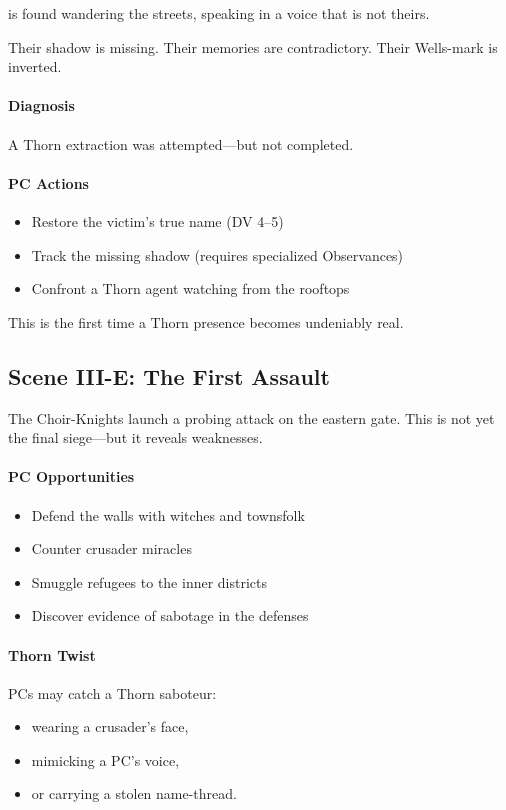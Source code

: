 \documentclass[11pt]{book}
\begin{document}
is found wandering the streets, speaking in a voice that is not theirs.

Their shadow is missing.  
Their memories are contradictory.  
Their Wells-mark is inverted.

\paragraph{Diagnosis}
A Thorn extraction was attempted---but not completed.

\paragraph{PC Actions}
\begin{itemize}
    \item Restore the victim's true name (DV 4--5)
    \item Track the missing shadow (requires specialized Observances)
    \item Confront a Thorn agent watching from the rooftops
\end{itemize}

This is the first time a Thorn presence becomes undeniably real.

\subsection*{Scene III-E: The First Assault}

The Choir-Knights launch a probing attack on the eastern gate.
This is not yet the final siege---but it reveals weaknesses.

\paragraph{PC Opportunities}
\begin{itemize}[leftmargin=*]
    \item Defend the walls with witches and townsfolk
    \item Counter crusader miracles
    \item Smuggle refugees to the inner districts
    \item Discover evidence of sabotage in the defenses
\end{itemize}

\paragraph{Thorn Twist}
PCs may catch a Thorn saboteur:
\begin{itemize}
    \item wearing a crusader's face,
    \item mimicking a PC's voice,
    \item or carrying a stolen name-thread.
\end{itemize}
\end{document}
